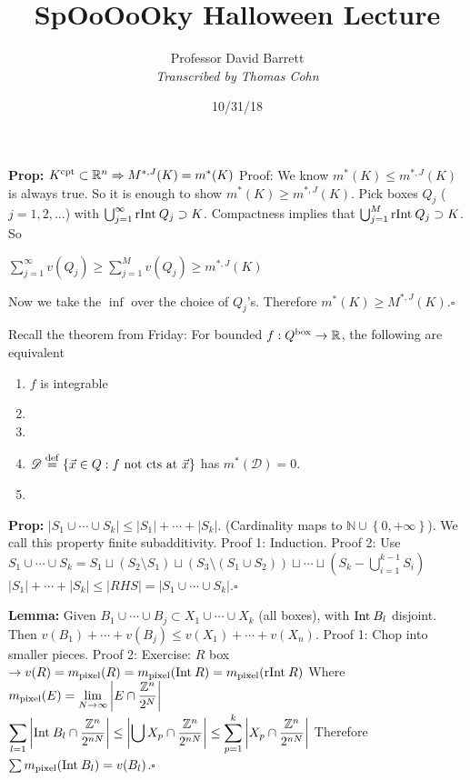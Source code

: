 \documentclass[10pt,letterpaper]{article}
\author{Professor David Barrett\\ \small\textit{Transcribed by Thomas Cohn}}
\title{SpOoOoOky Halloween Lecture}
\date{10/31/18} %
\newcommand{\n}{\hfill\break}
\newcommand{\lemma}[1]{\par\noindent\settowidth{\hangindent}{\textbf{Lemma: }}\textbf{Lemma: }#1}
\newcommand{\prop}[1]{\par\noindent\settowidth{\hangindent}{\textbf{Prop: }}\textbf{Prop: }#1\n}
\newcommand{\proven}{\;$\square$\n}
\newcommand{\ptxt}[1]{\textrm{\textnormal{#1}}}
\newcommand{\inlineeq}[1]{\centerline{$\displaystyle #1$}}
\newcommand{\card}[1]{\left|#1\right|}
\newcommand{\set}[1]{\left\{#1\right\}}
\newcommand{\naturals}{\mathbb{N}}
\newcommand{\N}{\naturals}
\newcommand{\integers}{\mathbb{Z}}
\newcommand{\Z}{\integers}
\newcommand{\reals}{\mathbb{R}}
\newcommand{\R}{\reals}
\newcommand{\Int}{\ptxt{Int}\>}
\newcommand{\rInt}{\ptxt{rInt}\>}
\begin{document}
\maketitle
\setlength\RaggedRightParindent{\parindent}
\RaggedRight

\prop{$K^{\ptxt{cpt}}\subset\R^{n}\Rightarrow{}M^{*,J}(K)=m^{*}(K)$\n
Proof: We know $m^{*}(K)\le{}m^{*,J}(K)$ is always true. So it is enough to show $m^{*}(K)\ge{}m^{*,J}(K)$.\n
Pick boxes $Q_{j}$ ($j=1,2,\ldots$) with $\bigcup_{j=1}^{\infty}\rInt{}Q_{j}\supset{}K$.\n
Compactness implies that $\bigcup_{j=1}^{M}\rInt{}Q_{j}\supset{}K$. So\n
\inlineeq{\sum_{j=1}^{\infty}v(Q_{j})\ge\sum_{j=1}^{M}v(Q_{j})\ge{}m^{*,J}(K)}\n
Now we take the $\inf$ over the choice of $Q_{j}$'s.\n
Therefore $m^{*}(K)\ge{}M^{*,J}(K)$.\proven}

\par\noindent Recall the theorem from Friday:\n
For bounded $f:Q^{\ptxt{box}}\to\R$, the following are equivalent\n
\begin{enumerate}
	\item $f$ is integrable
	\item 
	\item 
	\item $\mathscr{D}\overset{\ptxt{def}}{=}\set{\vec{x}\in{}Q:f\ptxt{ not cts at }\vec{x}}$ has $m^{*}(\mathscr{D})=0$.
	\item 
\end{enumerate}

\prop{$\card{S_{1}\cup\cdots\cup{}S_{k}}\le\card{S_{1}}+\cdots+\card{S_{k}}$. (Cardinality maps to $\N\cup\set{0,+\infty}$).\n
We call this property finite subadditivity.\n
Proof 1: Induction.\n
Proof 2: Use $S_{1}\cup\cdots\cup{}S_{k}=S_{1}\sqcup(S_{2}\setminus{}S_{1})\sqcup(S_{3}\setminus(S_{1}\cup{}S_{2}))\sqcup\cdots\sqcup(S_{k}-\bigcup_{i=1}^{k-1}S_{i})$\n
$\card{S_{1}}+\cdots+\card{S_{k}}\le\card{RHS}=\card{S_{1}\cup\cdots\cup{}S_{k}}$.\proven}

\lemma{Given $B_{1}\cup\cdots\cup{}B_{j}\subset{}X_{1}\cup\cdots\cup{}X_{k}$ (all boxes), with $\Int{}B_{l}$ disjoint.\n
Then $v(B_{1})+\cdots+v(B_{j})\le{}v(X_{1})+\cdots+v(X_{n})$.\n
Proof 1: Chop into smaller pieces.\n
Proof 2: Exercise: $R$ box $\to{}v(R)=m_{\ptxt{pixel}}(R)=m_{\ptxt{pixel}}(\Int{}R)=m_{\ptxt{pixel}}(\rInt{}R)$\n
Where $\displaystyle{}m_{\ptxt{pixel}}(E)=\lim_{N\to\infty}\card{E\cap\frac{\Z^{n}}{2^{N}}}$\n
\n
$\displaystyle\sum_{l=1}\card{\Int{}B_{l}\cap\frac{\Z^{n}}{2^{nN}}}\le\card{\bigcup{}X_{p}\cap\frac{\Z^{n}}{2^{nN}}}\le\sum_{p=1}^{k}\card{X_{p}\cap\frac{\Z^{n}}{2^{nN}}}$\n
\n
Therefore $\sum{}m_{\ptxt{pixel}}(\Int{}B_{l})=v(B_{l})$.\proven}
\end{document}
